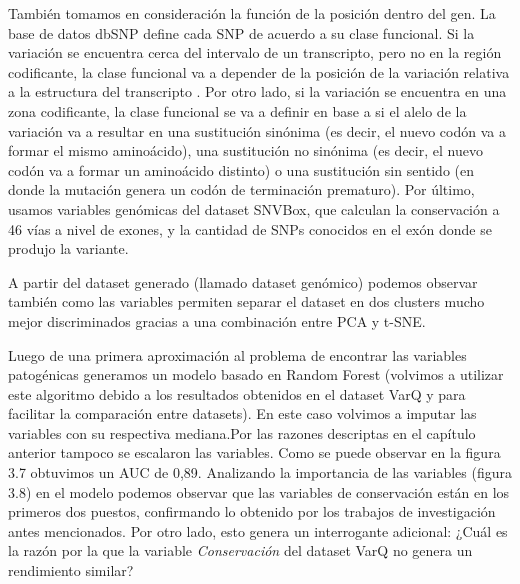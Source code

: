 También tomamos en consideración la función de la posición dentro del gen. La base de datos dbSNP define cada SNP de acuerdo a su clase funcional. Si la variación se encuentra cerca del intervalo de un transcripto, pero no en la región codificante, la clase funcional va a depender de la posición de la variación relativa a la estructura del transcripto \cite{Ostell2007}. Por otro lado, si la variación se encuentra en una zona codificante, la clase funcional se va a definir en base a si el alelo de la variación va a resultar en una sustitución sinónima (es decir, el nuevo codón va a formar el mismo aminoácido), una sustitución no sinónima (es decir, el nuevo codón va a formar un aminoácido distinto) o una sustitución sin sentido (en donde la mutación genera un codón de terminación prematuro).
Por último, usamos variables genómicas del dataset SNVBox, que calculan la conservación a 46 vías a nivel de exones, y la cantidad de SNPs conocidos en el exón donde se produjo la variante. 


A partir del dataset generado (llamado dataset genómico) podemos observar también como las variables permiten separar el dataset en dos clusters mucho mejor discriminados gracias a una combinación entre PCA y t-SNE.


Luego de una primera aproximación al problema de encontrar las variables patogénicas generamos un modelo basado en Random Forest (volvimos a utilizar este algoritmo debido a los resultados obtenidos en el dataset VarQ y para facilitar la comparación entre datasets). En este caso volvimos a imputar las variables con su respectiva mediana.Por las razones descriptas en el capítulo anterior tampoco se escalaron las variables. Como se puede observar en la figura 3.7 obtuvimos un AUC de 0,89. 
Analizando la importancia de las variables (figura 3.8) en el modelo podemos observar que las variables de conservación están en los primeros dos puestos, confirmando lo obtenido por los trabajos de investigación antes mencionados. Por otro lado, esto genera un interrogante adicional: ¿Cuál es la razón por la que la variable \textit{Conservación} del dataset VarQ no genera un rendimiento similar?


